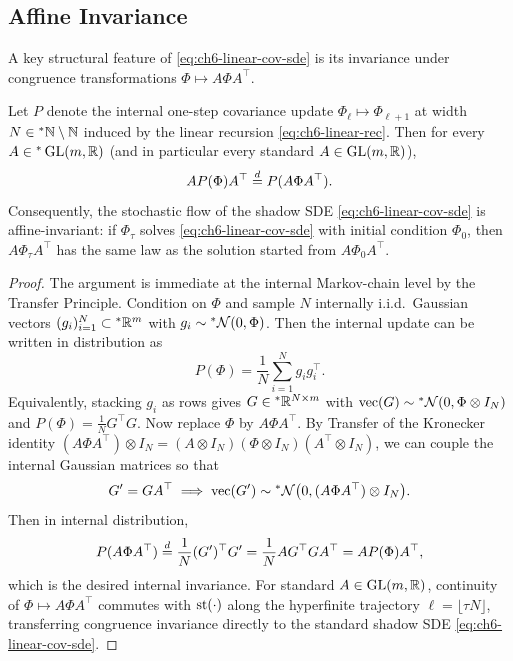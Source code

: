 \subsection{Affine Invariance}
\label{subsec:affine-invariance}

A key structural feature of \eqref{eq:ch6-linear-cov-sde} is its invariance under congruence transformations $\Phi \mapsto A\Phi A^\top$.

\begin{lemma}
\label{lem:affine-invariance}
Let $P$ denote the internal one-step covariance update $\Phi_\ell \mapsto \Phi_{\ell+1}$ at width $N \in {}^*\mathbb{N} \setminus \mathbb{N}$ induced by the linear recursion \eqref{eq:ch6-linear-rec}. Then for every $A \in {}^*\operatorname{GL}(m, \mathbb{R})$ (and in particular every standard $A \in \operatorname{GL}(m, \mathbb{R})$),
\begin{equation}
\label{eq:ch6-chain-congruence}
A P(\Phi) A^\top \stackrel{d}{=} P(A\Phi A^\top).
\end{equation}
Consequently, the stochastic flow of the shadow SDE \eqref{eq:ch6-linear-cov-sde} is affine-invariant: if $\Phi_\tau$ solves \eqref{eq:ch6-linear-cov-sde} with initial condition $\Phi_0$, then $A\Phi_\tau A^\top$ has the same law as the solution started from $A\Phi_0 A^\top$.
\end{lemma}

\begin{proof}
The argument is immediate at the internal Markov-chain level by the Transfer Principle. Condition on $\Phi$ and sample $N$ internally i.i.d.\ Gaussian vectors $(g_i)_{i=1}^N \subset {}^*\mathbb{R}^m$ with $g_i \sim {}^*\mathcal{N}(0, \Phi)$. Then the internal update can be written in distribution as
\begin{equation}
\label{eq:ch6-wishart-step}
P(\Phi) = \frac{1}{N}\sum_{i=1}^N g_i g_i^\top.
\end{equation}
Equivalently, stacking $g_i$ as rows gives $G \in {}^*\mathbb{R}^{N \times m}$ with $\operatorname{vec}(G) \sim {}^*\mathcal{N}(0, \Phi \otimes I_N)$ and $P(\Phi) = \frac{1}{N} G^\top G$. Now replace $\Phi$ by $A\Phi A^\top$. By Transfer of the Kronecker identity $(A\Phi A^\top) \otimes I_N = (A \otimes I_N)(\Phi \otimes I_N)(A^\top \otimes I_N)$, we can couple the internal Gaussian matrices so that
\begin{equation}
\label{eq:ch6-coupled-G}
G' = G A^\top \implies \operatorname{vec}(G') \sim {}^*\mathcal{N}\bigl(0, (A\Phi A^\top) \otimes I_N\bigr).
\end{equation}
Then in internal distribution,
\begin{equation}
\label{eq:ch6-congruence-proof}
P(A\Phi A^\top) \stackrel{d}{=} \frac{1}{N} (G')^\top G' = \frac{1}{N} A G^\top G A^\top = A P(\Phi) A^\top,
\end{equation}
which is the desired internal invariance. For standard $A \in \operatorname{GL}(m, \mathbb{R})$, continuity of $\Phi \mapsto A\Phi A^\top$ commutes with $\operatorname{st}(\cdot)$ along the hyperfinite trajectory $\ell = \lfloor \tau N \rfloor$, transferring congruence invariance directly to the standard shadow SDE \eqref{eq:ch6-linear-cov-sde}.
\end{proof}

